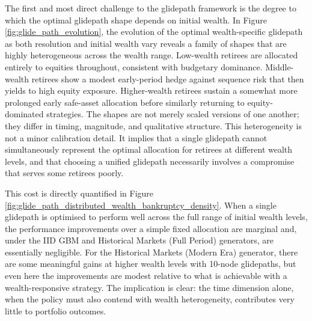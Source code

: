 \documentclass[11pt]{article}
\begin{document}
The first and most direct challenge to the glidepath framework is the degree to which the optimal glidepath shape depends on initial wealth. In Figure \ref{fig:glide_path_evolution}, the evolution of the optimal wealth-specific glidepath as both resolution and initial wealth vary reveals a family of shapes that are highly heterogeneous across the wealth range. Low-wealth retirees are allocated entirely to equities throughout, consistent with budgetary dominance. Middle-wealth retirees show a modest early-period hedge against sequence risk that then yields to high equity exposure. Higher-wealth retirees sustain a somewhat more prolonged early safe-asset allocation before similarly returning to equity-dominated strategies. The shapes are not merely scaled versions of one another; they differ in timing, magnitude, and qualitative structure. This heterogeneity is not a minor calibration detail. It implies that a single glidepath cannot simultaneously represent the optimal allocation for retirees at different wealth levels, and that choosing a unified glidepath necessarily involves a compromise that serves some retirees poorly.

This cost is directly quantified in Figure \ref{fig:glide_path_distributed_wealth_bankruptcy_density}. When a single glidepath is optimised to perform well across the full range of initial wealth levels, the performance improvements over a simple fixed allocation are marginal and, under the IID GBM and Historical Markets (Full Period) generators, are essentially negligible. For the Historical Markets (Modern Era) generator, there are some meaningful gains at higher wealth levels with 10-node glidepaths, but even here the improvements are modest relative to what is achievable with a wealth-responsive strategy. The implication is clear: the time dimension alone, when the policy must also contend with wealth heterogeneity, contributes very little to portfolio outcomes.
\end{document}
